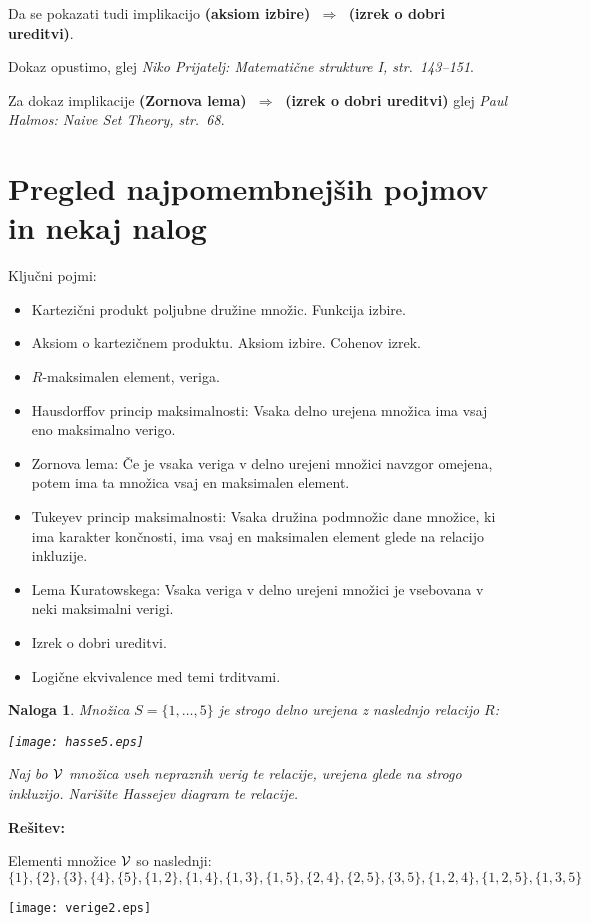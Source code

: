 \documentclass[11pt,paper=b5,footinclude,headinclude]{scrbook} %
\def\sledi {{~\Rightarrow~}}
\newtheorem*{problem}{Naloga}
\begin{document}
Da se pokazati tudi implikacijo \textbf{(aksiom izbire) $\sledi$ (izrek o dobri ureditvi)}.

Dokaz opustimo, glej \emph{ Niko Prijatelj: Matemati\v cne strukture I, str.~143--151}.

Za dokaz implikacije \textbf{(Zornova lema) $\sledi$ (izrek o dobri ureditvi)}
glej \emph{ Paul Halmos: Naive Set Theory, str.~68}.

\section{Pregled najpomembnejših pojmov in nekaj nalog}

Ključni pojmi:
\begin{itemize}
\item Kartezični produkt poljubne družine množic.
Funkcija izbire.
\item Aksiom o kartezičnem produktu. Aksiom izbire. Cohenov izrek.
\item $R$-maksimalen element, veriga.
\item Hausdorffov princip maksimalnosti: Vsaka delno urejena množica ima vsaj eno maksimalno verigo.
\item Zornova lema: Če je vsaka veriga v delno urejeni množici navzgor omejena, potem ima ta množica vsaj en maksimalen element.
\item Tukeyev princip maksimalnosti: Vsaka družina podmnožic dane množice, ki ima karakter končnosti, ima vsaj en maksimalen element glede na relacijo inkluzije.
\item Lema Kuratowskega: Vsaka veriga v delno urejeni množici je vsebovana v neki maksimalni verigi.
\item Izrek o dobri ureditvi.
\item Logične ekvivalence med temi trditvami.
\end{itemize}

\begin{problem}
Množica $S=\{1,\ldots,5\}$ je strogo delno urejena z naslednjo relacijo $R$:
\begin{center}
\texttt{[image: hasse5.eps]}
\end{center}
Naj bo ${\cal V}$ množica vseh nepraznih verig te relacije, urejena glede na strogo inkluzijo.
Narišite Hassejev diagram te relacije.
\end{problem}

\textbf{Rešitev:}

Elementi množice ${\cal V}$ so naslednji:
$$\{1\},\{2\},\{3\},\{4\},\{5\},
 \{1,2\}, \{1,4\}, \{1,3\}, \{1,5\},\{2,4\},\{2,5\}, \{3,5\},
 \{1,2,4\}, \{1,2,5\}, \{1,3,5\}$$
\begin{center}
\texttt{[image: verige2.eps]}
\end{center}
\end{document}
